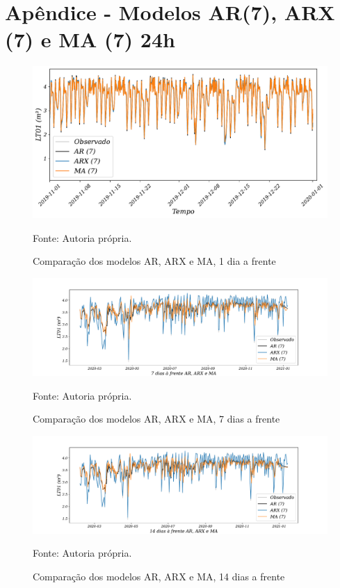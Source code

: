 
\section{Ap\^endice - Modelos AR(7), ARX (7) e MA (7) 24h }\label{sec:ararxma24}

\begin{figure}[H]
	\centering
	\caption{Comparação dos modelos AR, ARX e MA, 1 dia a frente }
	\label{fig:1-AR-ARX-MA24}
	\includegraphics[width=1\linewidth]{Apendices/Figuras/modelagem-24h/1-AR-ARX-MA}
	
	Fonte: Autoria própria.
\end{figure}

\begin{figure}[H]
	\centering
	\caption{Comparação dos modelos AR, ARX e MA, 7 dias a frente }
	\label{fig:10-AR-ARX-MA24}
	\includegraphics[width=1\linewidth]{Apendices/Figuras/modelagem-24h/7-AR-ARX-MA}
	
	Fonte: Autoria própria.
\end{figure}


\begin{figure}[H]
	\centering
	\caption{Comparação dos modelos AR, ARX e MA, 14 dias a frente }
	\label{fig:30-AR-ARX-MA24}
	\includegraphics[width=1\linewidth]{Apendices/Figuras/modelagem-24h/14-AR-ARX-MA}
	
	Fonte: Autoria própria.
\end{figure}

